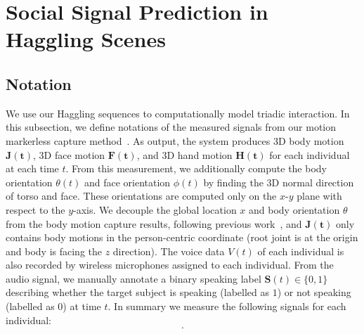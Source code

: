 
\section{Social Signal Prediction in Haggling Scenes}

\subsection{Notation}

We use our Haggling sequences to computationally model triadic interaction.  In this subsection, we define notations of the measured signals from our motion markerless capture method~\cite{joo2017panoptic, joo2018}. As output, the system produces 3D body motion $\mathbf{J(t)}$, 3D face motion $\mathbf{F(t)}$, and 3D hand motion $\mathbf{H(t)}$ for each individual at each time $t$. From this measurement, we additionally compute the body orientation $\theta(t)$ and face orientation $\phi(t)$ by finding the 3D normal direction of torso and face. These orientations are computed only on the $x$-$y$ plane with respect to the $y$-axis. We decouple the global location $x$ and body orientation $\theta$ from the body motion capture results, following previous work~\cite{jain2016structural, holden2016deep}, and $\mathbf{J(t)}$ only contains body motions in the person-centric coordinate (root joint is at the origin and body is facing the $z$ direction). The voice data $V(t)$ of each individual is also recorded by wireless microphones assigned to each individual. From the audio signal, we manually annotate a binary speaking label $\mathbf{S}(t) \in \{0,1\}$ describing whether the target subject is speaking (labelled as $1$) or not speaking (labelled as $0$) at time $t$. In summary we measure the following signals for each individual:
\begin{equation}
[ \mathbf{x}, \boldsymbol{\theta}, \boldsymbol{\phi}, \mathbf{J}, \mathbf{F}, \mathbf{H}, \mathbf{V}, \mathbf{S} ].
\label{equation:measurement}
\end{equation}

